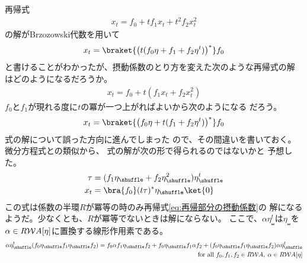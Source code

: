 	再帰式
	\begin{equation*}\begin{split} %
		x_t = f_0 + tf_1x_t + t^2f_2x_t^2
	\end{split}\end{equation*} %
	の解がBrzozowski代数を用いて
	\begin{equation*}\begin{split} %
		x_t = \braket{\bigl(t(f_0\eta + f_1 + f_2\eta^t)\bigr)^*}f_0
	\end{split}\end{equation*} %
	と書けることがわかったが、摂動係数のとり方を変えた次のような再帰式の解
	はどのようになるだろうか。
	\begin{equation}\label{eq:再帰部分の摂動係数}\begin{split} %
		x_t = f_0 +t(f_1x_t + f_2x_t^2)
	\end{split}\end{equation} %
	$f_0$と$f_1$が現れる度に$t$の冪が一つ上がればよいから次のようになる
	だろう。
	\begin{equation*}\begin{split} %
		x_t = \braket{\bigl(f_0\eta + t(f_1 + f_2\eta^t)\bigr)^*}f_0
	\end{split}\end{equation*} %
	式\label{eq:再帰部分の摂動係数}の解について誤った方向に進んでしまった
	ので、その間違いを書いておく。微分方程式との類似から、
	式\label{eq:再帰部分の摂動係数}の解が次の形で得られるのではないかと
	予想した。
	\begin{equation}\label{eq:再帰部分の摂動級数}\begin{split} %
		\tau &= (f_1\eta_\shuffle + f_2\eta_\shuffle^2)\eta_\shuffle^t \\
		x_t &= \bra{f_0}(t\tau)^*\eta_\shuffle\ket{0} \\
	\end{split}\end{equation} %
	この式は係数の半環$R$が冪等の時のみ再帰式\eqref{eq:再帰部分の摂動係数}の
	解になるようだ。少なくとも、$R$が冪等でないときは解にならない。
	ここで、$\alpha\eta_\shuffle^t$は$\eta_\shuffle$を
	$\alpha\in R\mathcal{W}{A}[\eta]$に置換する線形作用素である。
	\begin{equation*}\begin{split} %
		\alpha\eta_\shuffle^t(f_0\eta_\shuffle f_1\eta_\shuffle f_2)
		= f_0\alpha f_1\eta_\shuffle f_2 +  f_0\eta_\shuffle f_1\alpha f_2
			+ (f_0\eta_\shuffle f_1\eta_\shuffle f_2)\alpha\eta_\shuffle^t \\
		\quad\text{for all }f_0,f_1,f_2\in R\Word A,\;\alpha\in R\Word A[\eta]
	\end{split}\end{equation*} %
